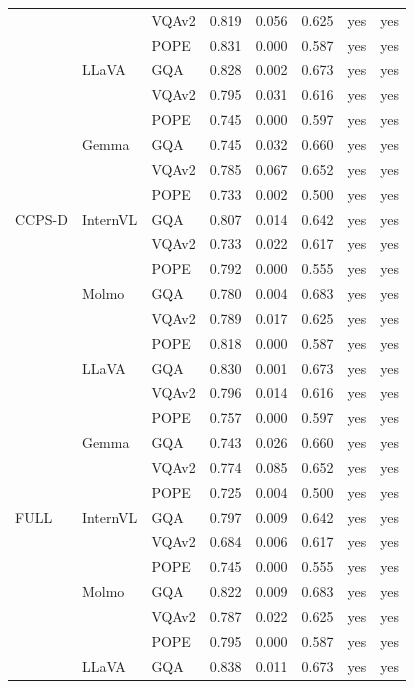 \begin{longtable}{@{\extracolsep{\fill}}lll rr r cc@{}}
 &  & VQAv2 & 0.819 & 0.056 & 0.625 & yes & yes \\
 &  & POPE & 0.831 & 0.000 & 0.587 & yes & yes \\
\addlinespace
 & LLaVA & GQA & 0.828 & 0.002 & 0.673 & yes & yes \\
 &  & VQAv2 & 0.795 & 0.031 & 0.616 & yes & yes \\
 &  & POPE & 0.745 & 0.000 & 0.597 & yes & yes \\
\addlinespace
 & Gemma & GQA & 0.745 & 0.032 & 0.660 & yes & yes \\
 &  & VQAv2 & 0.785 & 0.067 & 0.652 & yes & yes \\
 &  & POPE & 0.733 & 0.002 & 0.500 & yes & yes \\
\midrule
CCPS-D & InternVL & GQA & 0.807 & 0.014 & 0.642 & yes & yes \\
 &  & VQAv2 & 0.733 & 0.022 & 0.617 & yes & yes \\
 &  & POPE & 0.792 & 0.000 & 0.555 & yes & yes \\
\addlinespace
 & Molmo & GQA & 0.780 & 0.004 & 0.683 & yes & yes \\
 &  & VQAv2 & 0.789 & 0.017 & 0.625 & yes & yes \\
 &  & POPE & 0.818 & 0.000 & 0.587 & yes & yes \\
\addlinespace
 & LLaVA & GQA & 0.830 & 0.001 & 0.673 & yes & yes \\
 &  & VQAv2 & 0.796 & 0.014 & 0.616 & yes & yes \\
 &  & POPE & 0.757 & 0.000 & 0.597 & yes & yes \\
\addlinespace
 & Gemma & GQA & 0.743 & 0.026 & 0.660 & yes & yes \\
 &  & VQAv2 & 0.774 & 0.085 & 0.652 & yes & yes \\
 &  & POPE & 0.725 & 0.004 & 0.500 & yes & yes \\
\midrule
FULL & InternVL & GQA & 0.797 & 0.009 & 0.642 & yes & yes \\
 &  & VQAv2 & 0.684 & 0.006 & 0.617 & yes & yes \\
 &  & POPE & 0.745 & 0.000 & 0.555 & yes & yes \\
\addlinespace
 & Molmo & GQA & 0.822 & 0.009 & 0.683 & yes & yes \\
 &  & VQAv2 & 0.787 & 0.022 & 0.625 & yes & yes \\
 &  & POPE & 0.795 & 0.000 & 0.587 & yes & yes \\
\addlinespace
 & LLaVA & GQA & 0.838 & 0.011 & 0.673 & yes & yes \\

\end{longtable}

